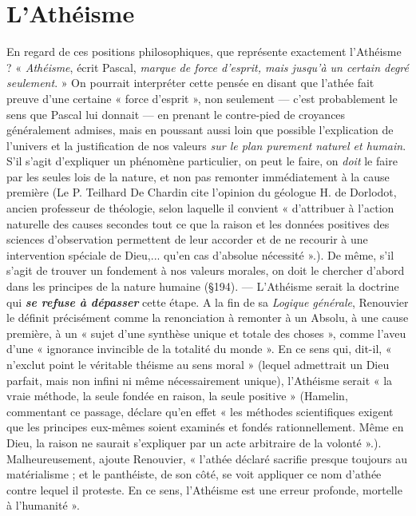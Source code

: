 \section{L’Athéisme}%
En regard de ces positions philosophiques,
que représente exactement l’Athéisme ? « {\it Athéisme}, écrit Pascal,
{\it marque de force d'esprit, mais jusqu’à un certain degré seulement}. »
On pourrait interpréter cette pensée en disant que l’athée fait preuve
d’une certaine « force d’esprit », non seulement — c’est probablement
le sens que Pascal lui donnait — en prenant le contre-pied de croyances
généralement admises, mais en poussant aussi loin que possible
l'explication de l’univers et la justification de nos valeurs {\it sur le plan
purement naturel et humain}. S'il s’agit d'expliquer un phénomène particulier,
on peut le faire, on {\it doit} le faire par les seules lois de la nature,
et non pas remonter immédiatement à la cause première
{\scriptsize (Le P. Teilhard De Chardin cite l'opinion du géologue H. de Dorlodot, ancien
professeur de théologie, selon laquelle il convient « d'attribuer à l’action naturelle des
causes secondes tout ce que la raison et les données positives des sciences d'observation
permettent de leur accorder et de ne recourir à une intervention spéciale de Dieu,... qu'en
cas d’absolue nécessité ».)}.
De même,
s’il s’agit de trouver un fondement à nos valeurs morales, on doit le
chercher d’abord dans les principes de la nature humaine (\S 194).
— L’Athéisme serait la doctrine qui \textbf{\textit {se refuse à dépasser}} cette
étape. A la fin de sa {\it Logique générale}, Renouvier le définit précisément
comme la renonciation à remonter à un Absolu, à une cause première,
à un « sujet d’une synthèse unique et totale des choses », comme
l’aveu d’une « ignorance invincible de la totalité du monde ». En ce
sens qui, dit-il, « n’exclut point le véritable théisme au sens moral »
(lequel admettrait un Dieu parfait, mais non infini ni même nécessairement
unique), l’Athéisme serait « la vraie méthode, la seule fondée
en raison, la seule positive »
{\scriptsize (Hamelin, commentant ce passage, déclare qu’en effet « les méthodes scientifiques
exigent que les principes eux-mêmes soient examinés et fondés rationnellement. Même
en Dieu, la raison ne saurait s'expliquer par un acte arbitraire de la volonté ».)}.
Malheureusement, ajoute Renouvier,
« l’athée déclaré sacrifie presque toujours au matérialisme ; et le
panthéiste, de son côté, se voit appliquer ce nom d’athée contre
lequel il proteste. En ce sens, l’Athéisme est une erreur profonde,
mortelle à l’humanité ».

